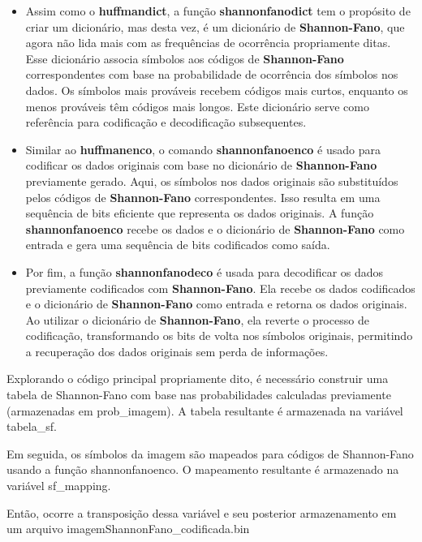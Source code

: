 \documentclass{article}
\begin{document}
\begin{itemize}
\item  Assim como o \textbf{huffmandict}, a função \textbf{shannonfanodict} tem o propósito de criar um dicionário, mas desta vez, é um dicionário de \textbf{Shannon-Fano}, que agora não lida mais com as frequências de ocorrência propriamente ditas. Esse dicionário associa símbolos aos códigos de \textbf{Shannon-Fano} correspondentes com base na probabilidade de ocorrência dos símbolos nos dados. Os símbolos mais prováveis recebem códigos mais curtos, enquanto os menos prováveis têm códigos mais longos. Este dicionário serve como referência para codificação e decodificação subsequentes.

\item Similar ao \textbf{huffmanenco}, o comando \textbf{shannonfanoenco} é usado para codificar os dados originais com base no dicionário de \textbf{Shannon-Fano} previamente gerado. Aqui, os símbolos nos dados originais são substituídos pelos códigos de \textbf{Shannon-Fano} correspondentes. Isso resulta em uma sequência de bits eficiente que representa os dados originais. A função \textbf{shannonfanoenco} recebe os dados e o dicionário de \textbf{Shannon-Fano} como entrada e gera uma sequência de bits codificados como saída.

\item Por fim, a  função \textbf{shannonfanodeco} é usada para decodificar os dados previamente codificados com \textbf{Shannon-Fano}. Ela recebe os dados codificados e o dicionário de \textbf{Shannon-Fano} como entrada e retorna os dados originais. Ao utilizar o dicionário de \textbf{Shannon-Fano}, ela reverte o processo de codificação, transformando os bits de volta nos símbolos originais, permitindo a recuperação dos dados originais sem perda de informações.
    
\end{itemize}

Explorando o código principal propriamente dito, é necessário construir uma tabela de Shannon-Fano com base nas probabilidades calculadas previamente (armazenadas em prob\_imagem). A tabela resultante é armazenada na variável tabela\_sf.

Em seguida, os símbolos da imagem são mapeados para códigos de Shannon-Fano usando a função shannonfanoenco. O mapeamento resultante é armazenado na variável sf\_mapping.

Então, ocorre a transposição dessa variável e seu posterior armazenamento em um arquivo imagemShannonFano\_codificada.bin
\end{document}
